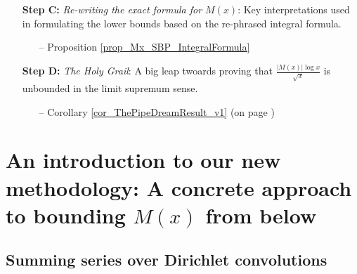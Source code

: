 \documentclass[11pt,reqno,a4letter]{article}
\numberwithin{figure}{section}
\numberwithin{table}{section}
\theoremstyle{plain}
\numberwithin{theorem}{section}
\theoremstyle{definition}
\begin{document}
\begin{itemize}[noitemsep,topsep=0pt]
\begin{itemize}[noitemsep,topsep=0pt]
     \end{itemize} 
\item[\textbf{Step C:}] \textit{Re-writing the exact formula for $M(x)$}: Key interpretations used in 
     formulating the lower bounds based on the re-phrased integral formula. 
     \begin{itemize}[noitemsep,topsep=0pt]
     \item[--] \small{Proposition \ref{prop_Mx_SBP_IntegralFormula}} 
     \end{itemize} 
\item[\textbf{Step D:}] \textit{The Holy Grail}: A big leap twoards proving that 
     $\frac{|M(x)| \log x}{\sqrt{x}}$ is 
     unbounded in the limit supremum sense. 
     \begin{itemize}[noitemsep,topsep=0pt]
     \item[--] \small{Corollary \ref{cor_ThePipeDreamResult_v1} (on page \pageref{proofOf_cor_ThePipeDreamResult_v1})} 
     \end{itemize} 

\end{itemize} 

\newpage 
\section{An introduction to our new methodology: A concrete approach to bounding $M(x)$ from below} 

\subsection{Summing series over Dirichlet convolutions} 
\end{document}
